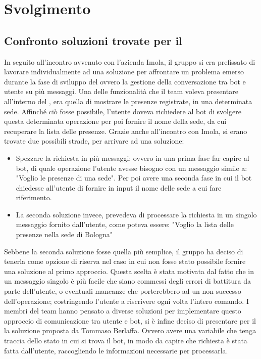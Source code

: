 \section{Svolgimento}
\subsection{Confronto soluzioni trovate per il }
In seguito all'incontro avvenuto con l'azienda Imola, il gruppo si era prefissato di lavorare individualmente ad una soluzione per affrontare un problema emerso durante la fase di sviluppo del  ovvero la gestione della conversazione tra bot e utente su più messaggi. Una delle funzionalità che il team voleva presentare all'interno del , era quella di mostrare le presenze registrate, in una determinata sede. 
Affinché ciò fosse possibile, l'utente doveva richiedere al bot di svolgere questa determinata operazione per poi fornire il nome della sede, da cui recuperare la lista delle presenze. Grazie anche all'incontro con Imola, si erano trovate due possibili strade, per arrivare ad una soluzione:
    \begin{itemize}
        \item Spezzare la richiesta in più messaggi: ovvero in una prima fase far capire al bot, di quale operazione l'utente avesse bisogno con un messaggio simile a: "Voglio le presenze di una sede". Per poi avere una seconda fase in cui il bot chiedesse all'utente di fornire in input il nome delle sede a cui fare riferimento. 
        \item La seconda soluzione invece, prevedeva di processare la richiesta in un singolo messaggio fornito dall'utente, come poteva essere: "Voglio la lista delle presenze nella sede di Bologna"
    \end{itemize}
Sebbene la seconda soluzione fosse quella più semplice, il gruppo ha deciso di tenerla come opzione di riserva nel caso in cui non fosse stato possibile fornire una soluzione al primo approccio. Questa scelta è stata motivata dal fatto che in un messaggio singolo è più facile che siano commessi degli errori di battitura da parte dell'utente, o eventuali mancanze che porterebbero ad un non successo dell'operazione; costringendo l'utente a riscrivere ogni volta l'intero comando. 
\newline
I membri del team hanno pensato a diverse soluzioni per implementare questo approccio di comunicazione tra utente e bot, si è infine deciso di presentare per il  la soluzione proposta da Tommaso Berlaffa. Ovvero avere una variabile che tenga traccia dello stato in cui si trova il bot, in modo da capire che richiesta è stata fatta dall'utente, raccogliendo le informazioni necessarie per processarla. 

